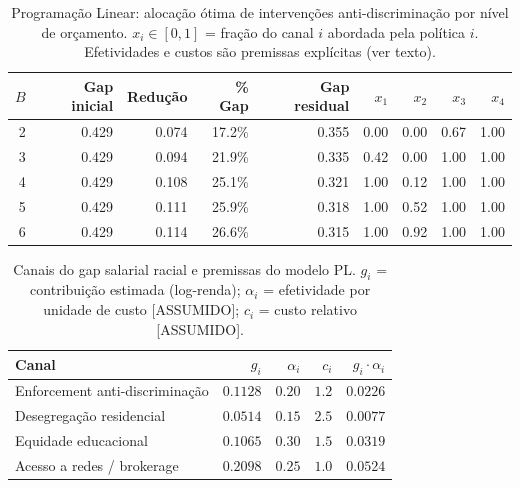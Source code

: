 \begin{table}[H]
  \centering
  \caption{Programação Linear: alocação ótima de intervenções anti-discriminação
           por nível de orçamento.
           $x_i \in [0,1]$ = fração do canal $i$ abordada pela política $i$.
           Efetividades e custos são premissas explícitas (ver texto).}
  \label{tab:po_pl}
  \small
  \begin{tabular}{rrrrrrrrr}
    \toprule
    $B$ & Gap inicial & Redução & \% Gap & Gap residual &
    $x_1$ & $x_2$ & $x_3$ & $x_4$ \\
    \midrule
  2 & 0.429 & 0.074 & 17.2\% & 0.355 & 0.00 & 0.00 & 0.67 & 1.00 \\
  3 & 0.429 & 0.094 & 21.9\% & 0.335 & 0.42 & 0.00 & 1.00 & 1.00 \\
  4 & 0.429 & 0.108 & 25.1\% & 0.321 & 1.00 & 0.12 & 1.00 & 1.00 \\
  5 & 0.429 & 0.111 & 25.9\% & 0.318 & 1.00 & 0.52 & 1.00 & 1.00 \\
  6 & 0.429 & 0.114 & 26.6\% & 0.315 & 1.00 & 0.92 & 1.00 & 1.00 \\
    \bottomrule
  \end{tabular}
\end{table}

\begin{table}[H]
  \centering
  \caption{Canais do gap salarial racial e premissas do modelo PL.
           $g_i$ = contribuição estimada (log-renda);
           $\alpha_i$ = efetividade por unidade de custo [ASSUMIDO];
           $c_i$ = custo relativo [ASSUMIDO].}
  \label{tab:po_canais}
  \small
  \begin{tabular}{lrrrr}
    \toprule
    Canal & $g_i$ & $\alpha_i$ & $c_i$ & $g_i \cdot \alpha_i$ \\
    \midrule
  Enforcement anti-discriminação & $0.1128$ & $0.20$ & $1.2$ & $0.0226$ \\
  Desegregação residencial & $0.0514$ & $0.15$ & $2.5$ & $0.0077$ \\
  Equidade educacional & $0.1065$ & $0.30$ & $1.5$ & $0.0319$ \\
  Acesso a redes / brokerage & $0.2098$ & $0.25$ & $1.0$ & $0.0524$ \\
    \bottomrule
  \end{tabular}
\end{table}
